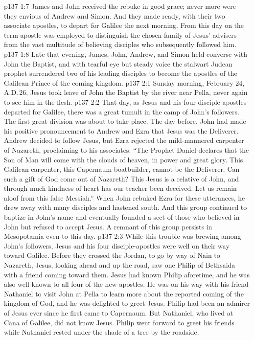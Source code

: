 \vs p137 1:7 James and John received the rebuke in good grace; never more were they envious of Andrew and Simon. And they made ready, with their two associate apostles, to depart for Galilee the next morning. From this day on the term apostle was employed to distinguish the chosen family of Jesus’ advisers from the vast multitude of believing disciples who subsequently followed him.
\vs p137 1:8 \pc Late that evening, James, John, Andrew, and Simon held converse with John the Baptist, and with tearful eye but steady voice the stalwart Judean prophet surrendered two of his leading disciples to become the apostles of the Galilean Prince of the coming kingdom.
\vs p137 2:1 Sunday morning, February 24, A.D.\,26, Jesus took leave of John the Baptist by the river near Pella, never again to see him in the flesh.
\vs p137 2:2 That day, as Jesus and his four disciple\hyp{}apostles departed for Galilee, there was a great tumult in the camp of John’s followers. The first great division was about to take place. The day before, John had made his positive pronouncement to Andrew and Ezra that Jesus was the Deliverer. Andrew decided to follow Jesus, but Ezra rejected the mild\hyp{}mannered carpenter of Nazareth, proclaiming to his associates: “The Prophet Daniel declares that the Son of Man will come with the clouds of heaven, in power and great glory. This Galilean carpenter, this Capernaum boatbuilder, cannot be the Deliverer. Can such a gift of God come out of Nazareth? This Jesus is a relative of John, and through much kindness of heart has our teacher been deceived. Let us remain aloof from this false Messiah.” When John rebuked Ezra for these utterances, he drew away with many disciples and hastened south. And this group continued to baptize in John’s name and eventually founded a sect of those who believed in John but refused to accept Jesus. A remnant of this group persists in Mesopotamia even to this day.
\vs p137 2:3 \pc While this trouble was brewing among John’s followers, Jesus and his four disciple\hyp{}apostles were well on their way toward Galilee. Before they crossed the Jordan, to go by way of Nain to Nazareth, Jesus, looking ahead and up the road, saw one Philip of Bethsaida with a friend coming toward them. Jesus had known Philip aforetime, and he was also well known to all four of the new apostles. He was on his way with his friend Nathaniel to visit John at Pella to learn more about the reported coming of the kingdom of God, and he was delighted to greet Jesus. Philip had been an admirer of Jesus ever since he first came to Capernaum. But Nathaniel, who lived at Cana of Galilee, did not know Jesus. Philip went forward to greet his friends while Nathaniel rested under the shade of a tree by the roadside.
